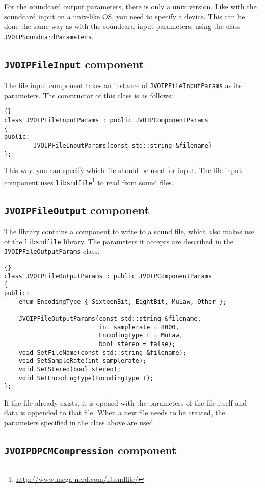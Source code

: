 		For the soundcard output parameters, there is only a unix version.
		Like with the soundcard input on a unix-like OS, you need to
		specify a device. This can be done the same way as with the soundcard
		input parameters, using the class {\tt JVOIPSoundcardParameters}.

		\subsection{{\tt JVOIPFileInput} component}

		The file input component takes an instance of {\tt JVOIPFileInputParams}
		as its parameters. The constructor of this class is as follows:

		\begin{lstlisting}[frame=tb]{}
class JVOIPFileInputParams : public JVOIPComponentParams
{
public:
		JVOIPFileInputParams(const std::string &filename)
};		
		\end{lstlisting}
		This way, you can specify which file should be used for input. The file
		input component uses {\tt libsndfile}\footnote{\url{http://www.mega-nerd.com/libsndfile/}}
		to read from sound files.
		
		\subsection{{\tt JVOIPFileOutput} component}

		The library contains a component to write to a sound file, which also
		makes use of the {\tt libsndfile} library. The parameters it accepts
		are described in the {\tt JVOIPFileOutputParams} class:
		\begin{lstlisting}[frame=tb]{}
class JVOIPFileOutputParams : public JVOIPComponentParams
{
public:
	enum EncodingType { SixteenBit, EightBit, MuLaw, Other };
	
	JVOIPFileOutputParams(const std::string &filename,
	                      int samplerate = 8000,
	                      EncodingType t = MuLaw,
	                      bool stereo = false);
	void SetFileName(const std::string &filename);
	void SetSampleRate(int samplerate);
	void SetStereo(bool stereo);
	void SetEncodingType(EncodingType t);
};
		\end{lstlisting}
		If the file already exists, it is opened with the parameters of the file itself 
		and data is appended to that file. When a new file needs to be created, the parameters
		specified in the class above are used.

		\subsection{{\tt JVOIPDPCMCompression} component}
		
